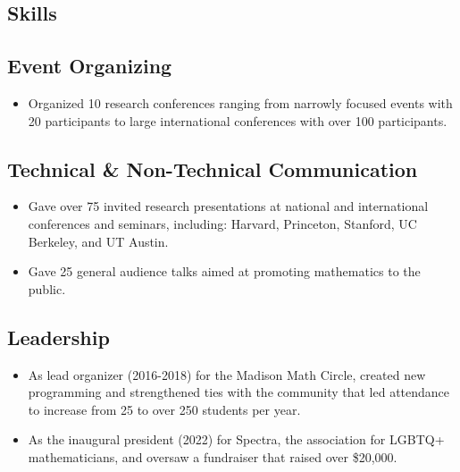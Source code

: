 \documentclass[
	10pt, %
]{FreemanCV}
\begin{document}
\begin{paracol}{2}

\section{Skills}

\subsection{Event Organizing}

\begin{itemize}[leftmargin=*]
\item Organized 10 research conferences ranging from narrowly focused events with 20 participants to large international conferences with over 100 participants.
\end{itemize}

\subsection{Technical \& Non-Technical Communication}

\begin{itemize}[leftmargin=*]
\item Gave over 75 invited research presentations at national and international conferences and seminars, including: Harvard, Princeton, Stanford, UC Berkeley, and UT Austin. \vspace{-.4em}
\item Gave 25 general audience talks aimed at promoting mathematics to the public. 
\end{itemize}

\subsection{Leadership}

\begin{itemize}[leftmargin=*]
\item As lead organizer (2016-2018) for the Madison Math Circle, created new programming and strengthened ties with the community that led attendance to increase from 25 to over 250 students per year. 
 \vspace{-.4em}
\item As the inaugural president (2022) for Spectra, the association for LGBTQ+ mathematicians, and oversaw a fundraiser that raised over \$20,000. 
\end{itemize}


\end{paracol}
\end{document}
